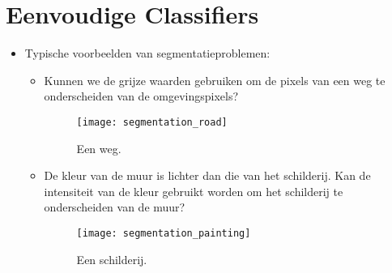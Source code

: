 \chapter{Eenvoudige Classifiers}
\begin{itemize}
	\item Typische voorbeelden van segmentatieproblemen:
	\begin{itemize}
		\item 
		Kunnen we de grijze waarden gebruiken om de pixels van een weg te onderscheiden van de omgevingspixels?
		
		\begin{figure}[ht]
			\centering
			\texttt{[image: segmentation\_road]}
			\caption{Een weg.}
			\label{fig:segmentation_road}
		\end{figure}
	
		\item 
		De kleur van de muur is lichter dan die van het schilderij. Kan de intensiteit van de kleur gebruikt worden om het schilderij te onderscheiden van de muur?
		
		\begin{figure}[ht]
			\centering
			\texttt{[image: segmentation\_painting]}
			\caption{Een schilderij.}
			\label{fig:segmentation_painting}
		\end{figure}
	\end{itemize}
\end{itemize}

\newpage
